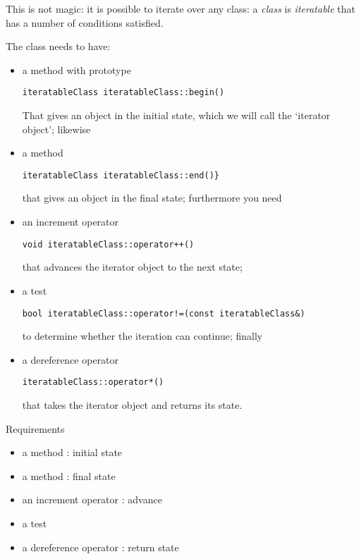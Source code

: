 This is not magic: it is possible to iterate over any class:
a \emph{class} is 
\emph{iteratable} that has a number of conditions satisfied.

The class needs to have:
\begin{itemize}
\item a method  with prototype
\begin{lstlisting}
iteratableClass iteratableClass::begin()
\end{lstlisting}
That gives an
  object in the initial state, which we will call the `iterator object'; likewise
\item a method 
\begin{lstlisting}
iteratableClass iteratableClass::end()} 
\end{lstlisting}
that gives an 
  object in the final state; furthermore you need
\item an increment operator
\begin{lstlisting}
void iteratableClass::operator++()
\end{lstlisting}
that
  advances the iterator object to the next state;
\item a test
\begin{lstlisting}
bool iteratableClass::operator!=(const iteratableClass&)
\end{lstlisting}
to determine
  whether the iteration can continue; finally
\item a dereference operator 
\begin{lstlisting}
iteratableClass::operator*()
\end{lstlisting}
that takes the iterator object and returns its state.
\end{itemize}

\begin{slide}{Requirements}
  \label{sl:rangemethods}
  \begin{itemize}
  \item a method : initial state
  \item a method :  final state
  \item an increment operator : advance
  \item a test 
  \item a dereference operator : return state
  \end{itemize}
\end{slide}

